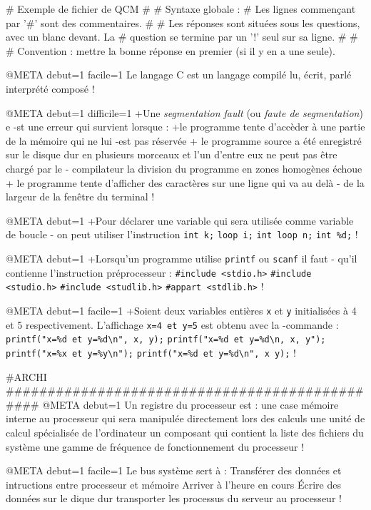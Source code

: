 # Exemple de fichier de QCM
#
# Syntaxe globale :
# Les lignes commençant par '#' sont des commentaires.
#
# Les réponses sont situées sous les questions, avec un blanc devant. La
# question se termine par un '!' seul sur sa ligne.
#
#
# Convention : mettre la bonne réponse en premier (si il y en a une seule).

@META debut=1 facile=1
Le langage C est un langage
 compilé
 lu, écrit, parlé
 interprété
 composé
!

@META debut=1 difficile=1
+Une \emph{segmentation fault} (ou \emph{faute de segmentation}) e
-st une erreur qui survient lorsque :
+le programme tente d'accèder à une partie de la mémoire qui ne lui
-est pas réservée
+ le programme source a été enregistré sur le disque dur en plusieurs
  morceaux et l'un d'entre eux ne peut pas être chargé par le
- compilateur
 la division du programme en zones homogènes échoue
+ le programme tente d'afficher des caractères sur une ligne qui va au delà
- de la largeur de la fenêtre du terminal
!

@META debut=1
+Pour déclarer une variable qui sera utilisée comme variable de boucle
- on peut utiliser l'instruction
  \verb|int k;|
  \verb|loop i;|
  \verb|int loop n;|
  \verb|int %d;|
!

@META debut=1
+Lorsqu'un programme utilise \verb|printf| ou \verb|scanf| il faut
- qu'il contienne l'instruction préprocesseur :
 \verb|#include <stdio.h>|
 \verb|#include <studio.h>|
 \verb|#include <studlib.h>|
 \verb|#appart <stdlib.h>|
!

@META debut=1 facile=1
+Soient deux variables entières \verb|x| et \verb|y| initialisées à
4 et 5 respectivement. L'affichage \verb|x=4 et y=5| est obtenu avec la
-commande :
 \verb|printf("x=%d et y=%d\n", x, y);|
 \verb|printf("x=%d et y=%d\n, x, y");|
 \verb|printf("x=%x et y=%y\n");|
 \verb|printf("x=%d et y=%d\n", x y);|
!

#ARCHI ###############################################
@META debut=1
Un registre du processeur est :
 une case mémoire interne au processeur qui sera manipulée directement lors des calculs
 une unité de calcul spécialisée de l'ordinateur
 un composant qui contient la liste des fichiers du système
 une gamme de fréquence de fonctionnement du processeur
!

@META debut=1 facile=1
Le bus système sert à :
 Transférer des données et intructions entre processeur et mémoire
 Arriver à l'heure en cours
 Écrire des données sur le dique dur
 transporter les processus du serveur au processeur
!

